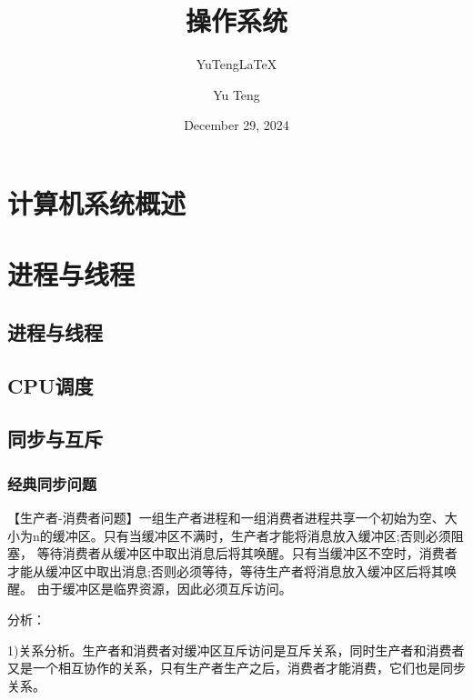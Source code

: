 \documentclass[lang=cn,10pt]{elegantbook}
\title{操作系统}
\subtitle{YuTeng\LaTeX{}}
\author{Yu Teng}
\institute{和光同尘}
\date{December 29, 2024}
\begin{document}
\maketitle
\frontmatter

\tableofcontents

\mainmatter

\chapter{计算机系统概述}

\section{}

\subsection{}


\chapter{进程与线程}

\section{进程与线程}

\section{CPU调度}

\section{同步与互斥}

\subsection{经典同步问题}

【生产者-消费者问题】一组生产者进程和一组消费者进程共享一个初始为空、大小为n的缓冲区。只有当缓冲区不满时，生产者才能将消息放入缓冲区;否则必须阻塞，
等待消费者从缓冲区中取出消息后将其唤醒。只有当缓冲区不空时，消费者才能从缓冲区中取出消息;否则必须等待，等待生产者将消息放入缓冲区后将其唤醒。
由于缓冲区是临界资源，因此必须互斥访问。

分析：

1)关系分析。生产者和消费者对缓冲区互斥访问是互斥关系，同时生产者和消费者又是一个相互协作的关系，只有生产者生产之后，消费者才能消费，它们也是同步关系。
\end{document}
